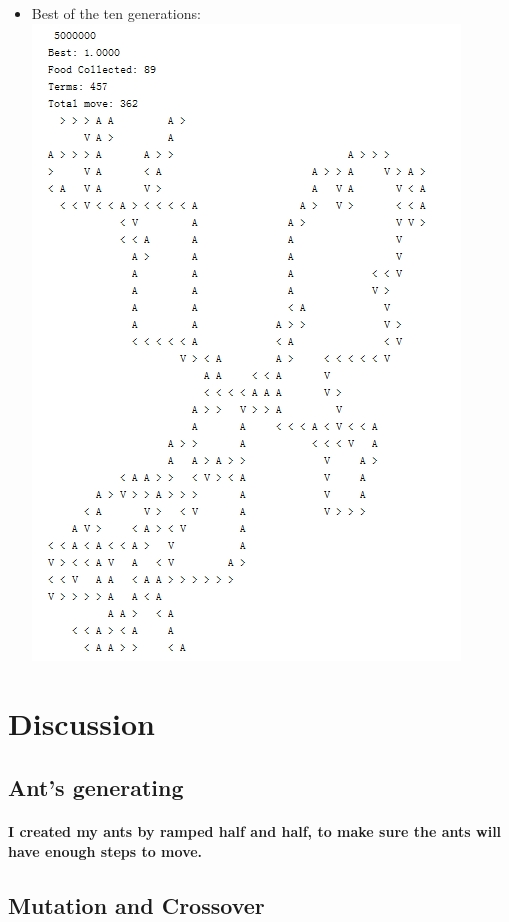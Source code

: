 \documentclass[12pt]{article} %
\begin{document}
\begin{itemize}
\item Best of the ten generations:\\
\includegraphics[scale=1]{best2.jpg}
\end{itemize}



\section{Discussion}
\subsection{Ant's generating}
\paragraph{I created my ants by ramped half and half, to make sure the ants will have enough steps to move.}

\subsection{Mutation and Crossover}
\end{document}
